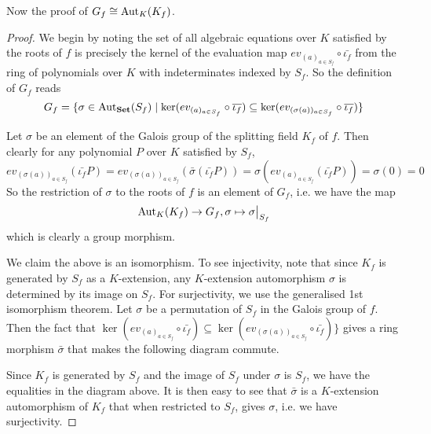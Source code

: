 \documentclass[../book.tex]{subfiles}
\begin{document}
Now the proof of $G_f \cong \text{Aut}_{K}(K_f)$.  

\begin{proof}
    
    We begin by noting 
    the set of all algebraic equations over $K$ satisfied by the roots of $f$ 
    is precisely the kernel of the evaluation map $ev_{(a)_{a\in S_f}}\circ\bar{\iota_f}$
    from the ring of polynomials over $K$ with indeterminates indexed by $S_f$. 
    So the definition of $G_f$ reads \[
        G_f = \{ \sigma \in \text{Aut}_{\mathbf{Set}}(S_f) \mid 
        \ker (ev_{(a)_{a\in S_f}} \circ \overline{\iota_f}) \subseteq 
        \ker (ev_{(\sigma(a))_{a\in S_f}}\circ \overline{\iota_f} )\}
    \]
    
    Let $\sigma$ be an element of the Galois group of the splitting field $K_f$ of $f$. 
    Then clearly for any polynomial $P$ over $K$ satisfied by $S_f$, \[
        ev_{(\sigma(a))_{a\in S_f}} (\bar{\iota_f} P) 
        = ev_{(\sigma(a))_{a\in S_f}} ( \bar{\sigma}(\bar{\iota_f} P) )
        = \sigma (ev_{(a)_{a\in S_f}} (\bar{\iota_f} P))
        = \sigma (0) = 0
    \]
    So the restriction of $\sigma$ to the roots of $f$ is an element of $G_f$,
    i.e. we have the map \[
        \aut{K}{K_f} \to G_f, \sigma \mapsto \res{\sigma}{S_f}
    \]
    which is clearly a group morphism. 
    
    We claim the above is an isomorphism. 
    To see injectivity, 
    note that since $K_f$ is generated by $S_f$ as a $K$-extension, 
    any $K$-extension automorphism $\sigma$ is determined by its image on $S_f$. 
    For surjectivity, we use the generalised 1st isomorphism theorem. 
    Let $\sigma$ be a permutation of $S_f$ in the Galois group of $f$. 
    Then the fact that 
    $\ker (ev_{(a)_{a\in S_f}} \circ \bar{\iota_f}) \subseteq 
    \ker (ev_{(\sigma(a))_{a\in S_f}}\circ \bar{\iota_f} )\}$
    gives a ring morphism $\bar{\sigma}$ that makes the following diagram commute.
    \begin{figure} [H]
        \centering
    \end{figure}
    Since $K_f$ is generated by $S_f$ and the image of $S_f$ under $\sigma$ is $S_f$,
    we have the equalities in the diagram above. 
    It is then easy to see that $\bar{\sigma}$ is a $K$-extension automorphism
    of $K_f$ that when restricted to $S_f$, gives $\sigma$,
    i.e. we have surjectivity. 
    
\end{proof}
\end{document}
